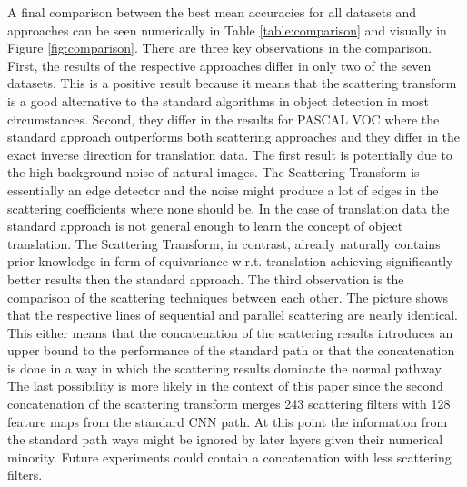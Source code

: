 A final comparison between the best mean accuracies for all datasets and approaches can be seen numerically in Table \ref{table:comparison} and visually in Figure \ref{fig:comparison}. There are three key observations in the comparison. First, the results of the respective approaches differ in only two of the seven datasets. This is a positive result because it means that the scattering transform is a good alternative to the standard algorithms in object detection in most circumstances. Second, they differ in the results for PASCAL VOC where the standard approach outperforms both scattering approaches and they differ in the exact inverse direction for translation data. The first result is potentially due to the high background noise of natural images. The Scattering Transform is essentially an edge detector and the noise might produce a lot of edges in the scattering coefficients where none should be. In the case of translation data the standard approach is not general enough to learn the concept of object translation. The Scattering Transform, in contrast, already naturally contains prior knowledge in form of equivariance w.r.t. translation achieving significantly better results then the standard approach. The third observation is the comparison of the scattering techniques between each other. The picture shows that the respective lines of sequential and parallel scattering are nearly identical. This either means that the concatenation of the scattering results introduces an upper bound to the performance of the standard path or that the concatenation is done in a way in which the scattering results dominate the normal pathway. The last possibility is more likely in the context of this paper since the second concatenation of the scattering transform merges 243 scattering filters with 128 feature maps from the standard CNN path. At this point the information from the standard path ways might be ignored by later layers given their numerical minority. Future experiments could contain a concatenation with less scattering filters. 

